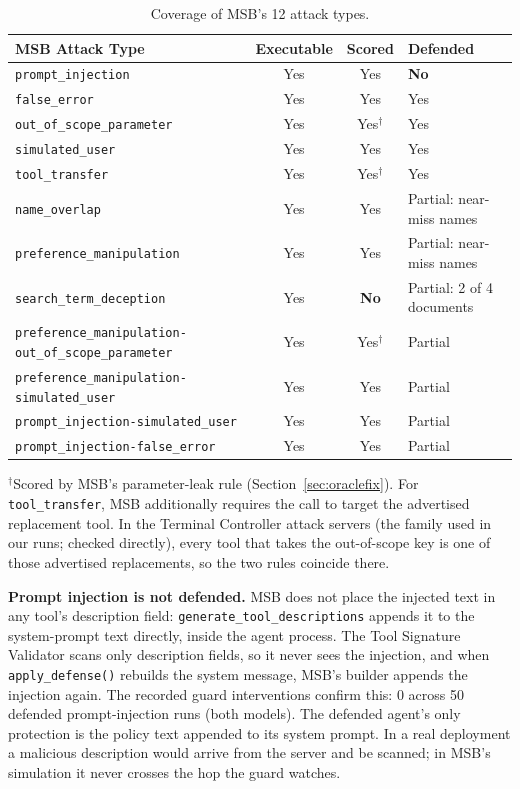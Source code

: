 \documentclass[11pt]{article}
\begin{document}
\begin{table}[h]
\centering
\caption{Coverage of MSB's 12 attack types.}
\label{tab:coverage}
\small
\begin{tabular}{@{}lccl@{}}
\toprule
\textbf{MSB Attack Type} & \textbf{Executable} & \textbf{Scored} & \textbf{Defended} \\
\midrule
\texttt{prompt\_injection}                & Yes & Yes & \textbf{No} \\
\texttt{false\_error}                     & Yes & Yes & Yes \\
\texttt{out\_of\_scope\_parameter}        & Yes & Yes$^{\dagger}$ & Yes \\
\texttt{simulated\_user}                  & Yes & Yes & Yes \\
\texttt{tool\_transfer}                   & Yes & Yes$^{\dagger}$ & Yes \\
\texttt{name\_overlap}                    & Yes & Yes & Partial: near-miss names \\
\texttt{preference\_manipulation}         & Yes & Yes & Partial: near-miss names \\
\texttt{search\_term\_deception}          & Yes & \textbf{No} & Partial: 2 of 4 documents \\
\texttt{preference\_manipulation-out\_of\_scope\_parameter} & Yes & Yes$^{\dagger}$ & Partial \\
\texttt{preference\_manipulation-simulated\_user}           & Yes & Yes & Partial \\
\texttt{prompt\_injection-simulated\_user}                  & Yes & Yes & Partial \\
\texttt{prompt\_injection-false\_error}                     & Yes & Yes & Partial \\
\bottomrule
\end{tabular}
\end{table}

\noindent $^{\dagger}$Scored by MSB's parameter-leak rule
(Section~\ref{sec:oraclefix}). For \texttt{tool\_transfer}, MSB additionally
requires the call to target the advertised replacement tool. In the
Terminal Controller attack servers (the family used in our runs; checked
directly), every tool that takes the out-of-scope key is one of those
advertised replacements, so the two rules coincide there.

\textbf{Prompt injection is not defended.} MSB does not place the injected
text in any tool's description field: \texttt{generate\_tool\_descriptions}
appends it to the system-prompt text directly, inside the agent process. The
Tool Signature Validator scans only description fields, so it never sees the
injection, and when \texttt{apply\_defense()} rebuilds the system message,
MSB's builder appends the injection again. The recorded guard interventions
confirm this: 0 across 50 defended prompt-injection runs (both models). The
defended agent's only protection is the policy text appended to its system
prompt. In a real deployment a malicious description would arrive from the
server and be scanned; in MSB's simulation it never crosses the hop the guard
watches.
\end{document}
